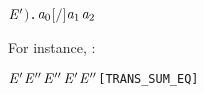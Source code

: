 \begin{itemize}
\begin{alltt}
             \HOLTokenTransBegin{}\HOLTokenTransEnd \ensuremath{\HOLBoundVar{E}\sp{\prime}}\ensuremath{)} \HOLSymConst{\HOLTokenDisj{}} \HOLSymConst{\HOLTokenExists{}} . \ensuremath{\HOLBoundVar{a}\sb{\mathrm{0}}} \HOLSymConst{\ensuremath{=}}    \HOLSymConst{\HOLTokenConj{}} \ensuremath{[}  \ensuremath{/}\ensuremath{]}  \HOLTokenTransBegin\ensuremath{\HOLBoundVar{a}\sb{\mathrm{1}}}\HOLTokenTransEnd \ensuremath{\HOLBoundVar{a}\sb{\mathrm{2}}}    
\end{alltt}  
For instance, :
\begin{alltt}
\HOLTokenTurnstile{}  \HOLSymConst{\ensuremath{+}} \ensuremath{\HOLFreeVar{E}\sp{\prime}} \HOLTokenTransBegin{}\HOLTokenTransEnd \ensuremath{\HOLFreeVar{E}\sp{\prime\prime}} \HOLSymConst{\HOLTokenEquiv{}}  \HOLTokenTransBegin{}\HOLTokenTransEnd \ensuremath{\HOLFreeVar{E}\sp{\prime\prime}} \HOLSymConst{\HOLTokenDisj{}} \ensuremath{\HOLFreeVar{E}\sp{\prime}} \HOLTokenTransBegin{}\HOLTokenTransEnd \ensuremath{\HOLFreeVar{E}\sp{\prime\prime}}\hfill{[TRANS_SUM_EQ]}
\end{alltt}
\end{itemize}

